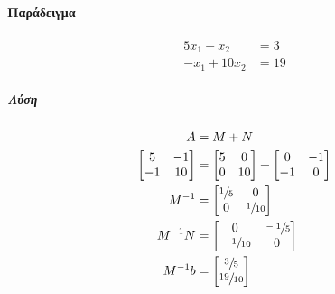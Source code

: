 \documentclass[11pt,a4paper,notitlepage,fleqn,final]{article}
\begin{document}
\paragraph{Παράδειγμα}
\begin{align*}
5x_1-x_2 &= 3 \\
-x_1+10x_2 &= 19
\end{align*}

\subparagraph{Λύση}
\begin{align*}
	A &= M + N \\
	\left[ \begin{matrix}
	5 & -1 \\ -1 & 10
	\end{matrix} \right] &= \left[\begin{matrix}
	5 & 0 \\ 0 & 10
	\end{matrix}\right] + \left[\begin{matrix}
	0 & -1 \\ -1 & 0
	\end{matrix}\right] \\
	M^{-1} &= \left[\begin{matrix}
	\sfrac{1}{5} & 0 \\ 0 & \sfrac{1}{10}
	\end{matrix}\right] \\
	M^{-1}N &= \left[\begin{matrix}
	0 & \sfrac{-1}{5} \\ \sfrac{-1}{10}  & 0
	\end{matrix}\right] \\
	M^{-1}b &= \left[\begin{matrix}
	\sfrac{3}{5} \\ \sfrac{19}{10}
	\end{matrix}\right]
\end{align*}
\end{document}
